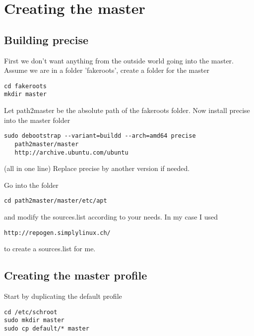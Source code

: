 \documentclass[a4paper]{book}
\begin{document}

\section{Creating the master}
\subsection{Building precise}
First we don't want anything from the outside world going into the master.
Assume we are in a folder 'fakeroots', create a folder for the master

\begin{verbatim}
cd fakeroots
mkdir master
\end{verbatim}

Let path2master be the absolute path of the fakeroots folder.
Now install precise into the master folder

\begin{verbatim}
sudo debootstrap --variant=buildd --arch=amd64 precise 
   path2master/master 
   http://archive.ubuntu.com/ubuntu
\end{verbatim}

(all in one line)
Replace precise by another version if needed.

Go into the folder

\begin{verbatim}
cd path2master/master/etc/apt
\end{verbatim}

and modify the sources.list according to your needs. In my case I used

\begin{verbatim}
http://repogen.simplylinux.ch/
\end{verbatim}

to create a sources.list for me.
\subsection{Creating the master profile}

Start by duplicating the default profile

\begin{verbatim}
cd /etc/schroot
sudo mkdir master
sudo cp default/* master
\end{verbatim}
\end{document}
